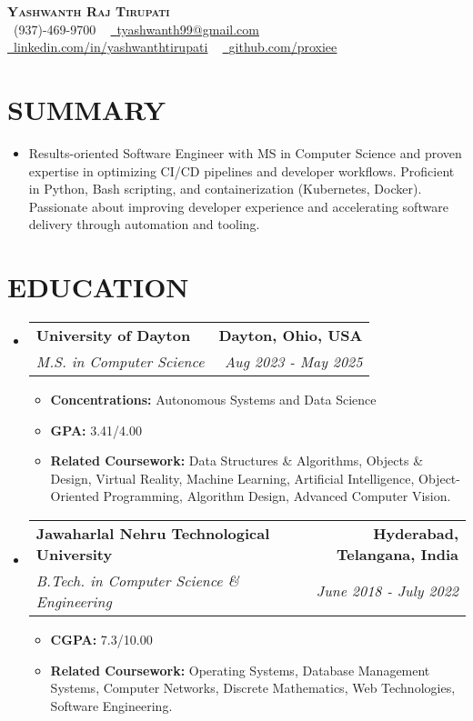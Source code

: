 \documentclass[letterpaper,11pt]{article}
\makeatletter
\newcommand{\resumeItem}[1]{\item\small{{#1 \vspace{-3pt}}}}
\newcommand{\resumeSubheading}[4]{\vspace{-2pt}\item\begin{tabular*}{0.97\textwidth}[t]{l@{\extracolsep{\fill}}r}\textbf{#1} & #2 \\\textit{\small#3} & \textit{\small #4} \\\end{tabular*}\vspace{-7pt}}
\newcommand{\resumeSubHeadingListStart}{\begin{itemize}[leftmargin=0.15in, label={}]}
\newcommand{\resumeSubHeadingListEnd}{\end{itemize}}
\newcommand{\resumeItemListStart}{\begin{itemize}}
\newcommand{\resumeItemListEnd}{\end{itemize}\vspace{-5pt}}
\makeatother
\begin{document}
\begin{center}
    \textbf{\Huge \scshape {\fontsize{15pt}{20pt}\selectfont Yashwanth Raj Tirupati}} \\ \vspace{1pt}
    \small \raisebox{-0.1\height}\faPhone\ (937)-469-9700 ~ \href{mailto:tyashwanth99@gmail.com}{\raisebox{-0.2\height}\faEnvelope\  \underline{tyashwanth99@gmail.com}} ~ 
    \href{https://linkedin.com/in/yashwanthtirupati}{\raisebox{-0.2\height}\faLinkedin\ \underline{linkedin.com/in/yashwanthtirupati}} ~ 
    \href{https://github.com/proxiee}{\raisebox{-0.2\height}\faGithub\ \underline{github.com/proxiee}}
    \vspace{-8pt}
\end{center}


\section{{\fontsize{9pt}{20pt}\selectfont \textbf{SUMMARY}}}
\resumeSubHeadingListStart

\resumeItem{Results-oriented Software Engineer with MS in Computer Science and proven expertise in optimizing CI/CD pipelines and developer workflows.  Proficient in Python, Bash scripting, and containerization (Kubernetes, Docker).  Passionate about improving developer experience and accelerating software delivery through automation and tooling.}
\resumeSubHeadingListEnd
\vspace{-18pt}

\section{{\fontsize{9pt}{20pt}\selectfont \textbf{EDUCATION}}}
\resumeSubHeadingListStart
\resumeSubheading{University of Dayton}{\textbf{Dayton, Ohio, USA}}{M.S. in Computer Science}{Aug 2023 - May 2025}
\resumeItemListStart
\resumeItem{\textbf{Concentrations:} Autonomous Systems and Data Science}
\resumeItem{\textbf{GPA:} 3.41/4.00}
\resumeItem{\textbf{Related Coursework:} Data Structures \& Algorithms, Objects \& Design, Virtual Reality, Machine Learning, Artificial Intelligence, Object-Oriented Programming, Algorithm Design, Advanced Computer Vision.}
\resumeItemListEnd
\resumeSubheading{Jawaharlal Nehru Technological University}{\textbf{Hyderabad, Telangana, India}}{B.Tech. in Computer Science \& Engineering}{June 2018 - July 2022}
\resumeItemListStart
\resumeItem{\textbf{CGPA:} 7.3/10.00}
\resumeItem{\textbf{Related Coursework:} Operating Systems, Database Management Systems, Computer Networks, Discrete Mathematics, Web Technologies, Software Engineering.}
\resumeItemListEnd
\resumeSubHeadingListEnd
\vspace{-18pt}
\end{document}

